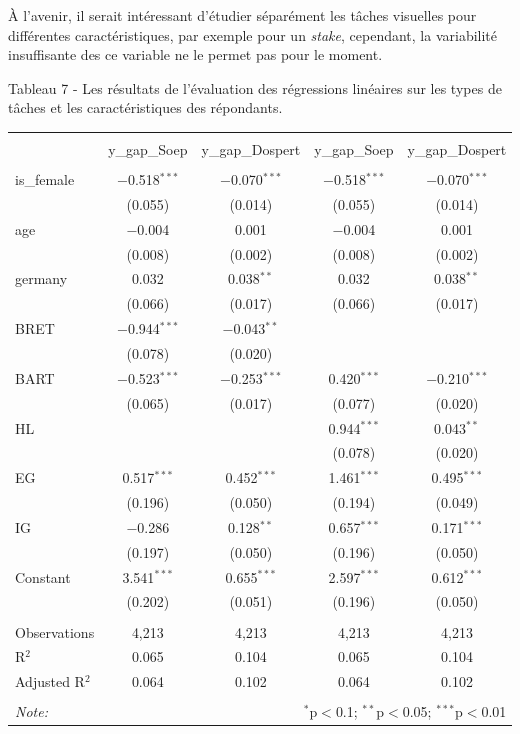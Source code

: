 \documentclass[12pt]{article}
\begin{document}
À l'avenir, il serait intéressant d'étudier séparément les tâches
visuelles pour différentes caractéristiques, par exemple pour un
\emph{stake}, cependant, la variabilité insuffisante des ce variable ne
le permet pas pour le moment.

Tableau 7 - Les résultats de l'évaluation des régressions linéaires sur
les types de tâches et les caractéristiques des répondants.

\begin{table}[H] \centering 

  \label{} 
\small 
\begin{tabular}{@{\extracolsep{-5pt}}lcccc} 
\\[-1.8ex]\\[-1.8ex] & y\_gap\_Soep & y\_gap\_Dospert & y\_gap\_Soep & y\_gap\_Dospert \\ 
\hline \\[-1.8ex] 
 is\_female & $-$0.518$^{***}$ & $-$0.070$^{***}$ & $-$0.518$^{***}$ & $-$0.070$^{***}$ \\ 
  & (0.055) & (0.014) & (0.055) & (0.014) \\ 
  age & $-$0.004 & 0.001 & $-$0.004 & 0.001 \\ 
  & (0.008) & (0.002) & (0.008) & (0.002) \\ 
  germany & 0.032 & 0.038$^{**}$ & 0.032 & 0.038$^{**}$ \\ 
  & (0.066) & (0.017) & (0.066) & (0.017) \\ 
  BRET & $-$0.944$^{***}$ & $-$0.043$^{**}$ &  &  \\ 
  & (0.078) & (0.020) &  &  \\ 
  BART & $-$0.523$^{***}$ & $-$0.253$^{***}$ & 0.420$^{***}$ & $-$0.210$^{***}$ \\ 
  & (0.065) & (0.017) & (0.077) & (0.020) \\ 
  HL &  &  & 0.944$^{***}$ & 0.043$^{**}$ \\ 
  &  &  & (0.078) & (0.020) \\ 
  EG & 0.517$^{***}$ & 0.452$^{***}$ & 1.461$^{***}$ & 0.495$^{***}$ \\ 
  & (0.196) & (0.050) & (0.194) & (0.049) \\ 
  IG & $-$0.286 & 0.128$^{**}$ & 0.657$^{***}$ & 0.171$^{***}$ \\ 
  & (0.197) & (0.050) & (0.196) & (0.050) \\ 
  Constant & 3.541$^{***}$ & 0.655$^{***}$ & 2.597$^{***}$ & 0.612$^{***}$ \\ 
  & (0.202) & (0.051) & (0.196) & (0.050) \\ 
 \hline \\[-1.8ex] 
Observations & 4,213 & 4,213 & 4,213 & 4,213 \\ 
R$^{2}$ & 0.065 & 0.104 & 0.065 & 0.104 \\ 
Adjusted R$^{2}$ & 0.064 & 0.102 & 0.064 & 0.102 \\ 
\hline \\[-1.8ex] 
\textit{Note:}  & \multicolumn{4}{r}{$^{*}$p$<$0.1; $^{**}$p$<$0.05; $^{***}$p$<$0.01} \\ 
\end{tabular} 
\end{table}
\end{document}
